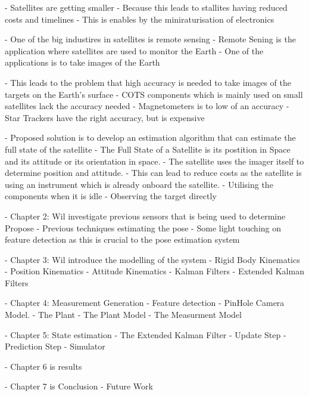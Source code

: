 \label{chap:introduction}

\label{sec:overview}

- Satellites are getting smaller
- Because this leads to stallites having reduced costs and timelines
- This is enables by the miniraturisation of electronics

- One of the big industires in satellites is remote sensing
- Remote Sening is the application where satellites are used to monitor the Earth
- One of the applications is to take images of the Earth

- This leads to the problem that high accuracy is needed to take images of the targets on the Earth's surface
- COTS components which is mainly used on small satellites lack the accuracy needed
- Magnetometers is to low of an accuracy
- Star Trackers have the right accuracy, but is expensive

\label{sec:description}

- Proposed solution is to develop an estimation algorithm that can estimate the full state of the satellite
- The Full State of a Satellite is its postition in Space and its attitude or its orientation in space.
- The satellite uses the imager itself to determine position and attitude.
- This can lead to reduce costs as the satellite is using an instrument which is already onboard the satellite.
- Utilising the components when it is idle
- Observing the target directly


\label{sec:outline}

- Chapter 2: Wil investigate previous sensors that is being used to determine Propose
- Previous techniques estimating the pose
- Some light touching on feature detection as this is crucial to the pose estimation system

- Chapter 3: Wil introduce the modelling of the system
- Rigid Body Kinematics
- Position Kinematics
- Attitude Kinematics
- Kalman Filters
- Extended Kalman Filters

- Chapter 4: Measurement Generation
- Feature detection
- PinHole Camera Model.
- The Plant
- The Plant Model
- The Measurment Model

- Chapter 5: State estimation
- The Extended Kalman Filter
- Update Step
- Prediction Step
- Simulator

- Chapter 6 is results

- Chapter 7 is Conclusion
- Future Work